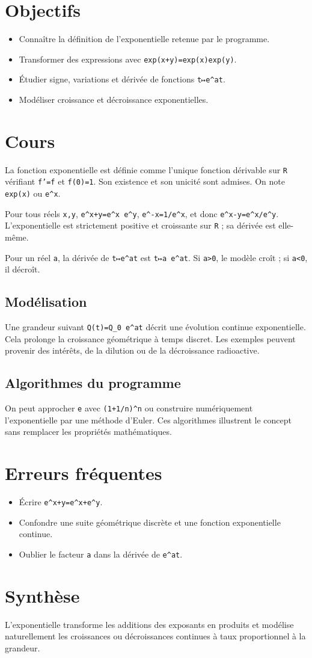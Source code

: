 \section{Objectifs}
\begin{itemize}
\item Connaître la définition de l'exponentielle retenue par le programme.
\item Transformer des expressions avec \texttt{exp(x+y)=exp(x)exp(y)}.
\item Étudier signe, variations et dérivée de fonctions \texttt{t↦e^{at}}.
\item Modéliser croissance et décroissance exponentielles.
\end{itemize}

\section{Cours}
La fonction exponentielle est définie comme l'unique fonction dérivable sur \texttt{R} vérifiant \texttt{f'=f} et \texttt{f(0)=1}. Son existence et son unicité sont admises. On note \texttt{exp(x)} ou \texttt{e^x}.

Pour tous réels \texttt{x,y}, \texttt{e^{x+y}=e^x e^y}, \texttt{e^{-x}=1/e^x}, et donc \texttt{e^{x-y}=e^x/e^y}. L'exponentielle est strictement positive et croissante sur \texttt{R} ; sa dérivée est elle-même.

Pour un réel \texttt{a}, la dérivée de \texttt{t↦e^{at}} est \texttt{t↦a e^{at}}. Si \texttt{a>0}, le modèle croît ; si \texttt{a<0}, il décroît.

\subsection{Modélisation}
Une grandeur suivant \texttt{Q(t)=Q_0 e^{at}} décrit une évolution continue exponentielle. Cela prolonge la croissance géométrique à temps discret. Les exemples peuvent provenir des intérêts, de la dilution ou de la décroissance radioactive.

\subsection{Algorithmes du programme}
On peut approcher \texttt{e} avec \texttt{(1+1/n)^n} ou construire numériquement l'exponentielle par une méthode d'Euler. Ces algorithmes illustrent le concept sans remplacer les propriétés mathématiques.

\section{Erreurs fréquentes}
\begin{itemize}
\item Écrire \texttt{e^{x+y}=e^x+e^y}.
\item Confondre une suite géométrique discrète et une fonction exponentielle continue.
\item Oublier le facteur \texttt{a} dans la dérivée de \texttt{e^{at}}.
\end{itemize}

\section{Synthèse}
L'exponentielle transforme les additions des exposants en produits et modélise naturellement les croissances ou décroissances continues à taux proportionnel à la grandeur.
